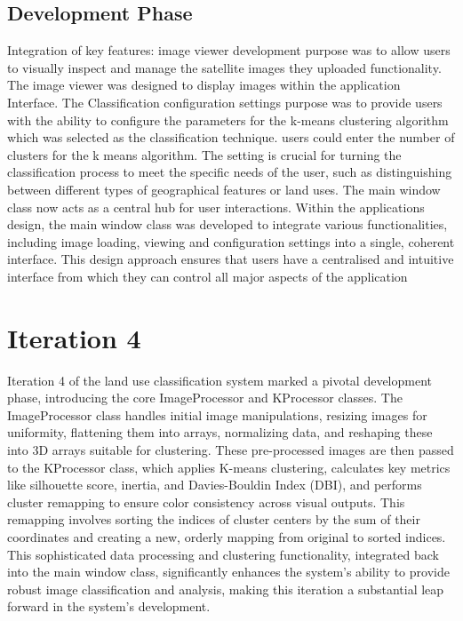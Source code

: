 \subsection{Development Phase}\label{subsec:development-phase2}

Integration of key features: image viewer development purpose was to allow users to visually inspect and manage the satellite images they uploaded functionality.
The image viewer was designed to display images within the application Interface.
The Classification configuration settings purpose was to provide users with the ability to configure the parameters
for the k-means clustering algorithm which was selected as the classification technique.
users could enter the number of clusters for the k means algorithm.
The setting is crucial for turning the classification process to meet the specific needs of the user,
such as distinguishing between different types of geographical features or land uses.
The main window class now acts as a central hub for user interactions.
Within the applications design, the main window class was developed to integrate various functionalities,
including image loading, viewing and configuration settings into a single, coherent interface.
This design approach ensures that users have a centralised and intuitive interface from which they can control all major aspects of the application


\section{Iteration 4}\label{sec:iteration-4}

Iteration 4 of the land use classification system marked a pivotal development phase, introducing the core ImageProcessor and KProcessor classes.
The ImageProcessor class handles initial image manipulations, resizing images for uniformity, flattening them into arrays, normalizing data,
and reshaping these into 3D arrays suitable for clustering.
These pre-processed images are then passed to the KProcessor class,
which applies K-means clustering, calculates key metrics like silhouette score, inertia, and Davies-Bouldin Index (DBI),
and performs cluster remapping to ensure color consistency across visual outputs.
This remapping involves sorting the indices of cluster centers by the sum of their coordinates and creating a new,
orderly mapping from original to sorted indices.
This sophisticated data processing and clustering functionality,
integrated back into the main window class,
significantly enhances the system’s ability to provide robust image classification and analysis,
making this iteration a substantial leap forward in the system's development.


